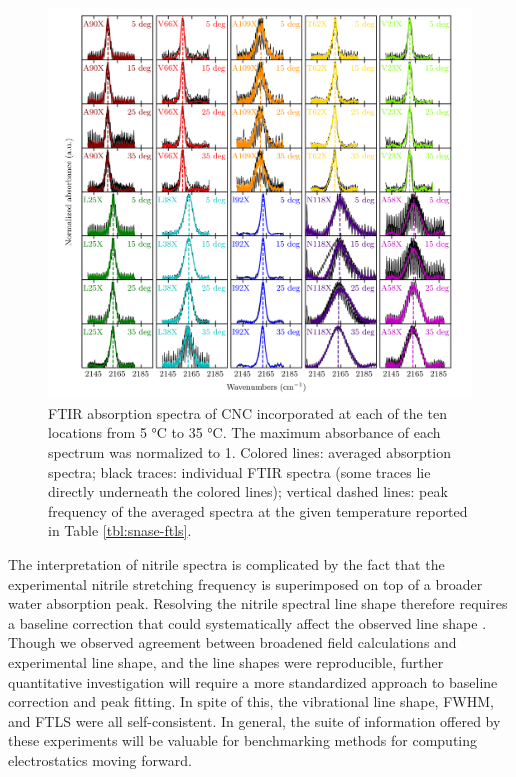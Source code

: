 \begin{figure}
    \center
    \includegraphics[width=\double]{figures-snase/ftls_all_spectra.png}
    \caption[]{
        FTIR absorption spectra of CNC incorporated at each of the ten locations from 5 \si{\celsius} to 35 \si{\celsius}. 
        The maximum absorbance of each spectrum was normalized to 1. 
        Colored lines: averaged absorption spectra; 
        black traces: individual FTIR spectra (some traces lie directly underneath the colored lines); 
        vertical dashed lines: peak frequency of the averaged spectra at the given temperature reported in Table \ref{tbl:snase-ftls}.
    }
    \label{fig:snase-ftls_spectra}
\end{figure}

The interpretation of nitrile spectra is complicated by the fact that the experimental nitrile stretching frequency is superimposed on top of a broader water absorption peak. 
Resolving the nitrile spectral line shape therefore requires a baseline correction that could systematically affect the observed line shape \cite{vanWilderen2014}. 
Though we observed agreement between broadened field calculations and experimental line shape, and the line shapes were reproducible, further quantitative investigation will require a more standardized approach to baseline correction and peak fitting. 
In spite of this, the vibrational line shape, FWHM, and FTLS were all self-consistent. 
In general, the suite of information offered by these experiments will be valuable for benchmarking methods for computing electrostatics moving forward.

